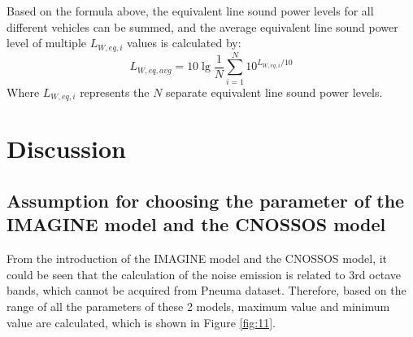 \documentclass{article}
\begin{document}
\noindent Based on the formula above, the equivalent line sound power levels for all different vehicles can be summed, and the average equivalent line sound power level of multiple $L_{W,eq,i}$ values is calculated by:
\begin{equation}
    L_{W,eq,avg}=10 \lg{\frac{1}{N} \sum_{i=1}^N 10^{L_{W,eq,i}/10 }}
\end{equation}
\noindent Where $L_{W,eq,i}$ represents the $N$ separate equivalent line sound power levels.


\section{{\color{red} Discussion}}

\subsection{Assumption for choosing the parameter of the IMAGINE model and the {\color{red} CNOSSOS} model}
\noindent From the introduction of the IMAGINE model and the CNOSSOS model, it could be seen that the calculation of the noise emission is related to 3rd octave bands, which cannot be acquired from Pneuma dataset. Therefore, based on the range of all the parameters of these 2 models, maximum value and minimum value are calculated, which is shown in Figure \ref{fig:11}.
\end{document}

